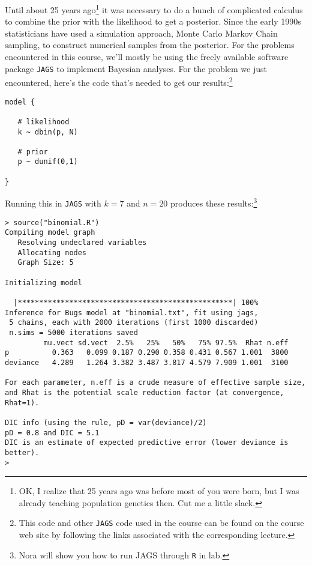 \documentclass[12pt]{article}
\begin{document}
Until about 25 years ago\footnote{OK, I realize that 25 years ago was
  before most of you were born, but I was already teaching population
  genetics then. Cut me a little slack.} it was necessary to do a
bunch of complicated calculus to combine the prior with the likelihood
to get a posterior. Since the early 1990s statisticians have used a
simulation approach, Monte Carlo Markov Chain sampling, to construct
numerical samples from the posterior. For the problems encountered in
this course, we'll mostly be using the freely available software
package {\tt JAGS} to implement Bayesian analyses. For the problem
we just encountered, here's the code that's needed to get our
results:\footnote{This code and other {\tt JAGS} code used in the
  course can be found on the course web site by following the links
  associated with the corresponding
  lecture.}
\begin{verbatim}
model {

   # likelihood
   k ~ dbin(p, N)

   # prior
   p ~ dunif(0,1)

}
\end{verbatim}
Running this in {\tt JAGS} with $k=7$ and $n=20$ produces these
results:\footnote{Nora will show you how to run JAGS through {\tt R}
  in lab.}
\begin{verbatim}
> source("binomial.R")
Compiling model graph
   Resolving undeclared variables
   Allocating nodes
   Graph Size: 5

Initializing model

  |**************************************************| 100%
Inference for Bugs model at "binomial.txt", fit using jags,
 5 chains, each with 2000 iterations (first 1000 discarded)
 n.sims = 5000 iterations saved
         mu.vect sd.vect  2.5%   25%   50%   75% 97.5%  Rhat n.eff
p          0.363   0.099 0.187 0.290 0.358 0.431 0.567 1.001  3800
deviance   4.289   1.264 3.382 3.487 3.817 4.579 7.909 1.001  3100

For each parameter, n.eff is a crude measure of effective sample size,
and Rhat is the potential scale reduction factor (at convergence, Rhat=1).

DIC info (using the rule, pD = var(deviance)/2)
pD = 0.8 and DIC = 5.1
DIC is an estimate of expected predictive error (lower deviance is better).
>
\end{verbatim}
\end{document}
